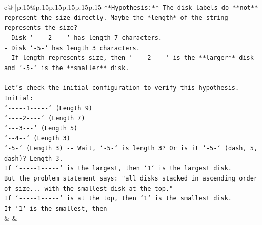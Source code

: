 \documentclass{article}
\begin{document}
{\begin{supertabular}{c@{$\;$}|p{.15\linewidth}@{}p{.15\linewidth}p{.15\linewidth}p{.15\linewidth}p{.15\linewidth}p{.15\linewidth}}
{{{\texttt{**Hypothesis:** The disk labels do **not** represent the size directly. Maybe the *length* of the string represents the size?} \\
\texttt{{-} Disk `{-}{-}{-}{-}2{-}{-}{-}{-}` has length 7 characters.} \\
\texttt{{-} Disk `{-}5{-}` has length 3 characters.} \\
\texttt{{-} If length represents size, then `{-}{-}{-}{-}2{-}{-}{-}{-}` is the **larger** disk and `{-}5{-}` is the **smaller** disk.} \\
\\ 
\texttt{Let's check the initial configuration to verify this hypothesis.} \\
\texttt{Initial:} \\
\texttt{`{-}{-}{-}{-}{-}1{-}{-}{-}{-}{-}` (Length 9)} \\
\texttt{`{-}{-}{-}{-}2{-}{-}{-}{-}` (Length 7)} \\
\texttt{`{-}{-}{-}3{-}{-}{-}` (Length 5)} \\
\texttt{`{-}{-}4{-}{-}` (Length 3)} \\
\texttt{`{-}5{-}` (Length 3) {-}{-} Wait, `{-}5{-}` is length 3? Or is it `{-}5{-}` (dash, 5, dash)? Length 3.} \\
\texttt{If `{-}{-}{-}{-}{-}1{-}{-}{-}{-}{-}` is the largest, then `1` is the largest disk.} \\
\texttt{But the problem statement says: "all disks stacked in ascending order of size... with the smallest disk at the top."} \\
\texttt{If `{-}{-}{-}{-}{-}1{-}{-}{-}{-}{-}` is at the top, then `1` is the smallest disk.} \\
\texttt{If `1` is the smallest, then} \\
            }
        }
    }
    & & \\ \\


\end{supertabular}}
\end{document}

